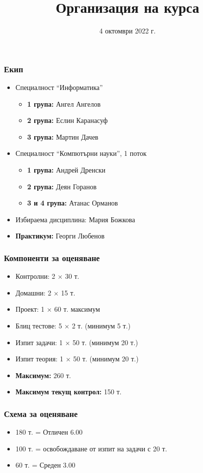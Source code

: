 \documentclass[alsotrans]{beamerswitch}
\title{Организация на курса}
\date{4 октомври 2022 г.}
\begin{document}
\begin{frame}
  \titlepage
\end{frame}

\begin{frame}
  \frametitle{Екип}

  \begin{itemize}
  \item Специалност ``Информатика''
    \begin{itemize}
    \item \textbf{1 група:} Ангел Ангелов
    \item \textbf{2 група:} Еслин Каранасуф
    \item \textbf{3 група:} Мартин Дачев
    \end{itemize}
  \item Специалност ``Компютърни науки'', 1 поток
    \begin{itemize}
    \item \textbf{1 група:} Андрей Дренски
    \item \textbf{2 група:} Деян Горанов
    \item \textbf{3 и 4 група:} Атанас Орманов
    \end{itemize}
  \item Избираема дисциплина: Мария Божкова
  \item \textbf{Практикум:} Георги Любенов
\end{itemize}
\end{frame}

\begin{frame}
  \frametitle{Компоненти за оценяване}

  \begin{itemize}
  \item Контролни: 2 $\times$ 30 т.
  \item Домашни: 2 $\times$ 15 т.
  \item Проект: 1 $\times$ 60 т. максимум
  \item Блиц тестове: 5 $\times$ 2 т. \alert{(минимум 5 т.)}
  \item Изпит задачи: 1 $\times$ 50 т. \alert{(минимум 20 т.)}
  \item Изпит теория: 1 $\times$ 50 т. \alert{(минимум 20 т.)}
  \item \textbf{Максимум:} 260 т.
  \item \textbf{Максимум текущ контрол:} 150 т.
  \end{itemize}
\end{frame}

\begin{frame}
  \frametitle{Схема за оценяване}

  \begin{itemize}
  \item 180 т. = Отличен 6.00
  \item 100 т. = освобождаване от изпит на задачи с 20 т.
  \item 60 т. = Среден 3.00
  \end{itemize}
\end{frame}
\end{document}
